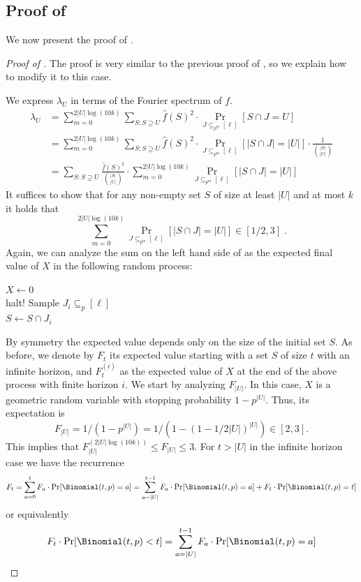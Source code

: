 \subsection{Proof of }
\label{subsection:proof-ninf-ub-lb-set}
We now present the proof of .
\begin{proof}[Proof of ]
The proof is very similar to the previous proof of , so we explain how to modify it to this case.	

We express $\lambda_U$ in terms of the Fourier spectrum of $f$.
\begin{align*}
\lambda_U &= \sum_{m=0}^{2|U|\log(10k)} \sum_{S: S \supseteq U} \hat{f}(S)^2 \cdot \Pr_{J \subseteq_{p^{m}} [\ell]}[ S \cap J = U]
\\ &= \sum_{m=0}^{2|U|\log(10k)} \sum_{S: S \supseteq U} \hat{f}(S)^2 \cdot \Pr_{J \subseteq_{p^{m}} [\ell]}[ |S \cap J| = |U|] \cdot \frac{1}{\binom{|S|}{|U|}}
\\&=\sum_{S: S \supseteq U} \frac{\hat{f}(S)^2}{\binom{|S|}{|U|}} \cdot \sum_{m=0}^{2|U|\log(10k)} \Pr_{J \subseteq_{p^{m}} [\ell]}[ |S \cap J| = |U|]\end{align*}
It suffices to show that for any non-empty set $S$ of size at least $|U|$ and at most $k$ it holds that
\begin{equation}\label{eq:2}
\sum_{m=0}^{2|U|\log(10k)} \Pr_{J \subseteq_{p^{m}} [\ell]}[ |S \cap J| = |U|] \in [1/2,3]\;.
\end{equation}
Again, we can analyze the sum on the left hand side of  as the expected final value of $X$ in the following random process:

\begin{algorithm}
$X \leftarrow 0$ \\
 {
     { 
        halt!
    }
	Sample $J_i \subseteq_p [\ell]$ \\
	$S \leftarrow S \cap J_i$
}
\end{algorithm}
By symmetry the expected value depends only on the size of the initial set $S$.
As before, we denote by $F_{t}$ its expected value starting with a set $S$ of size $t$ with an infinite horizon, and $F_t^{(i)}$ as the expected value of $X$ at the end of the above process with finite horizon $i$.
We start by analyzing $F_{|U|}$.
In this case, $X$ is a geometric random variable with stopping probability $1- p^{|U|}$.
Thus, its expectation is $$F_{|U|} = 1/(1-p^{|U|}) = 1/(1-(1-1/2|U|)^{|U|}) \in [2,3].$$
This implies that $F_{|U|}^{(2|U|\log(10k))} \leq F_{|U|} \leq 3$. For $t > |U|$ in the infinite horizon case we have the recurrence
\begin{equation}
	F_t = \sum_{a=0}^{t} F_a \cdot \Pr[\Binomial(t,p)=a]
	 = \sum_{a=|U|}^{t-1} F_a \cdot \Pr[\Binomial(t,p)=a]  + F_t \cdot \Pr[\Binomial(t,p)=t]
\end{equation}
or equivalently
\begin{equation}
	F_t\cdot \Pr[\Binomial(t,p)<t] = \sum_{a=|U|}^{t-1} F_a \cdot \Pr[\Binomial(t,p)=a]
\end{equation}


\end{proof}
